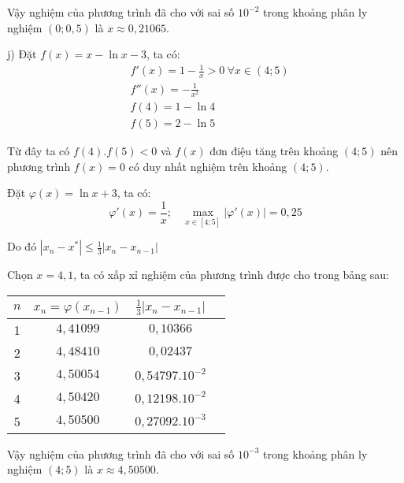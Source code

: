 Vậy nghiệm của phương trình đã cho với sai số $10^{-2}$ trong khoảng phân ly nghiệm $(0;0,5)$ là $x\approx 0,21065$.\par

j) Đặt $f(x)=x-\ln x-3$, ta có:
\begin{align*}
	&f'(x)=1-\frac{1}{x}>0~\forall x\in (4;5)\\
	&f''(x)=-\frac{1}{x^2}\\
	&f(4)=1-\ln 4\\
	&f(5)=2-\ln 5
\end{align*}

Từ đây ta có $f(4).f(5)<0$ và $f(x)$ đơn điệu tăng trên khoảng $(4;5)$ nên phương trình $f(x)=0$ có duy nhất nghiệm trên khoảng $(4;5)$.\par

Đặt $\varphi(x)=\ln x+3$, ta có:
$$\varphi'(x)=\frac{1}{x};~~~~
\max_{x\in [4;5]} |\varphi'(x)| = 0,25$$

Do đó $|x_n-x^*|\leqslant \frac{1}{3}|x_n-x_{n-1}|$\par
Chọn $x=4,1$, ta có xấp xỉ nghiệm của phương trình được cho trong bảng sau:
\begin{longtable}{|c|c|Sc|}\hline
$n$&$x_n=\varphi(x_{n-1})$&$\frac{1}{3}|x_n-x_{n-1}|$\\ &$4,41099$&$0,10366$\\ &$4,48410$&$0,02437$\\ &$4,50054$&$0,54797.10^{-2}$\\ &$4,50420$&$0,12198.10^{-2}$\\ &$4,50500$&$0,27092.10^{-3}$\\ \hline
\end{longtable}

Vậy nghiệm của phương trình đã cho với sai số $10^{-3}$ trong khoảng phân ly nghiệm $(4;5)$ là $x\approx 4,50500$.\par
